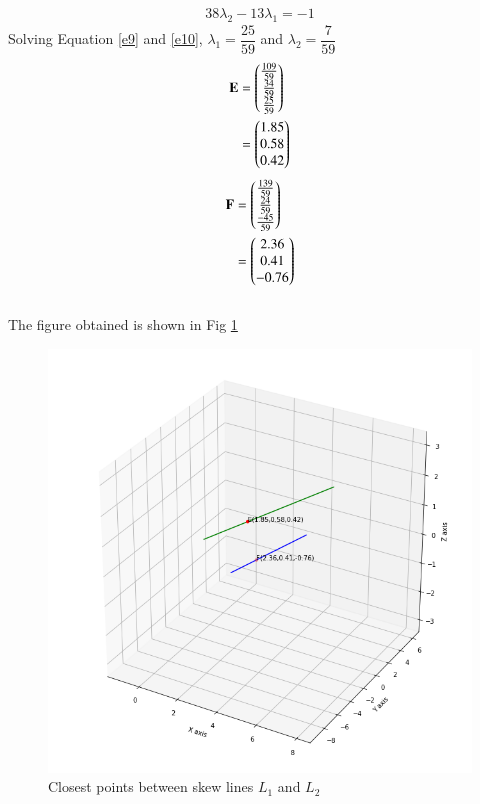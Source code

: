 \documentclass[journal,12pt,twocolumn]{IEEEtran}
\begin{document}
\begin{align}\label{e10}
   38\lambda_2-13\lambda_1 = -1
\end{align}
Solving Equation \ref{e9} and \ref{e10}, $\lambda_1 = \dfrac{25}{59}$ and $\lambda_2 = \dfrac{7}{59}$\\
\begin{align}
    \mathbf{E} & = \begin{pmatrix}\frac{109}{59} \\ \frac{34}{59}
    \\ \frac{25}{59}\end{pmatrix}
    \\&=\begin{pmatrix}1.85 \\ 0.58 \\ 0.42\end{pmatrix}
\end{align}
\begin{align}
    \mathbf{F} & = \begin{pmatrix}\frac{139}{59} \\ \frac{24}{59}
    \\ \frac{-45}{59}\end{pmatrix}
    \\&=\begin{pmatrix}2.36 \\ 0.41 \\ -0.76\end{pmatrix}
\end{align}
\\
The figure obtained is shown in Fig \ref{myfig}
\renewcommand{\thefigure}{1}
\begin{figure}[h!]
    \centering
    \includegraphics[width=\columnwidth]{closest.png}
    \caption{Closest points between skew lines $L_1$ and $L_2$}
    \label{myfig}
\end{figure}
\end{document}
